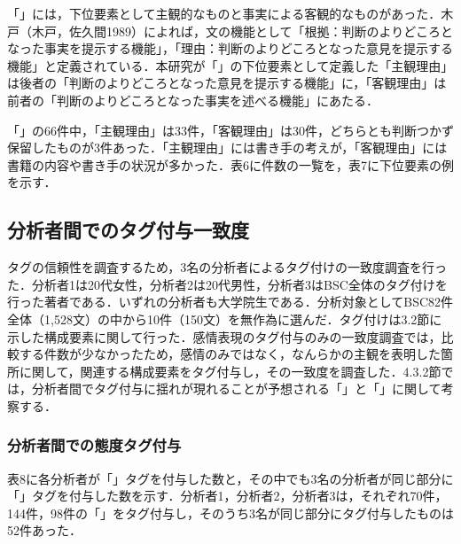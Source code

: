 \documentclass[japanese]{jnlp_1.3a}
\begin{document}
「」には，下位要素として主観的なものと事実による客観的なものがあった．木戸（木戸，佐久間1989）によれば，文の機能として「根拠：判断のよりどころとなった事実を提示する機能」，「理由：判断のよりどころとなった意見を提示する機能」と定義されている．本研究が「」の下位要素として定義した「主観理由」は後者の「判断のよりどころとなった意見を提示する機能」に，「客観理由」は前者の「判断のよりどころとなった事実を述べる機能」にあたる．

「」の66件中，「主観理由」は33件，「客観理由」は30件，どちらとも判断つかず保留したものが3件あった．「主観理由」には書き手の考えが，「客観理由」には書籍の内容や書き手の状況が多かった．表6に件数の一覧を，表7に下位要素の例を示す．

\begin{table}[b]
\begin{center}

\end{center}
\end{table}

\begin{table}[t]
\begin{center}

\end{center}
\end{table}

\subsection{分析者間でのタグ付与一致度}

タグの信頼性を調査するため，3名の分析者によるタグ付けの一致度調査を行った．分析者1は20代女性，分析者2は20代男性，分析者3はBSC全体のタグ付けを行った著者である．いずれの分析者も大学院生である．分析対象としてBSC82件全体（1,528文）の中から10件（150文）を無作為に選んだ．タグ付けは3.2節に示した構成要素に関して行った．感情表現のタグ付与のみの一致度調査では，比較する件数が少なかったため，感情のみではなく，なんらかの主観を表明した箇所に関して，関連する構成要素をタグ付与し，その一致度を調査した．4.3.2節では，分析者間でタグ付与に揺れが現れることが予想される「」と「」に関して考察する．

\subsubsection{分析者間での態度タグ付与}

表8に各分析者が「」タグを付与した数と，その中でも3名の分析者が同じ部分に「」タグを付与した数を示す．分析者1，分析者2，分析者3は，それぞれ70件，144件，98件の「」をタグ付与し，そのうち3名が同じ部分にタグ付与したものは52件あった． 
\end{document}
